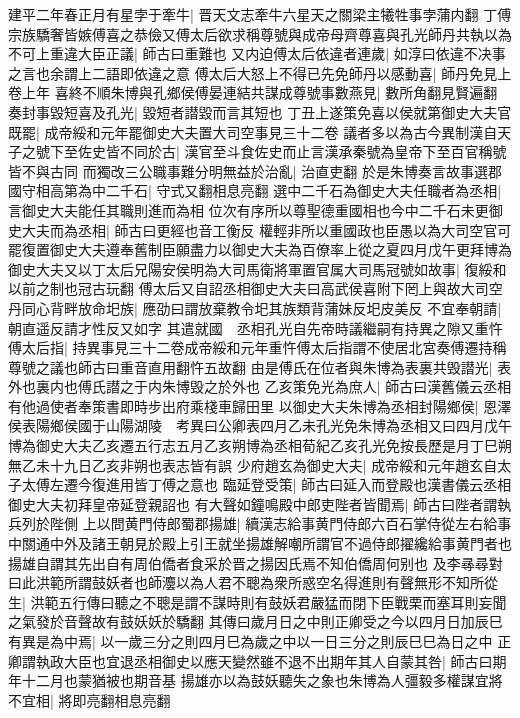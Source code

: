 建平二年春正月有星孛于牽牛|{
	晋天文志牽牛六星天之關梁主犧牲事孛蒲内翻}
丁傅宗族驕奢皆嫉傅喜之恭儉又傅太后欲求稱尊號與成帝母齊尊喜與孔光師丹共執以為不可上重違大臣正議|{
	師古曰重難也}
又内迫傅太后依違者連歲|{
	如淳曰依違不决事之言也余謂上二語即依違之意}
傅太后大怒上不得已先免師丹以感動喜|{
	師丹免見上卷上年}
喜終不順朱博與孔鄉侯傅晏連結共謀成尊號事數燕見|{
	數所角翻見賢遍翻}
奏封事毀短喜及孔光|{
	毀短者譛毀而言其短也}
丁丑上遂策免喜以侯就第御史大夫官既罷|{
	成帝綏和元年罷御史大夫置大司空事見三十二卷}
議者多以為古今異制漢自天子之號下至佐史皆不同於古|{
	漢官至斗食佐史而止言漢承秦號為皇帝下至百官稱號皆不與古同}
而獨改三公職事難分明無益於治亂|{
	治直吏翻}
於是朱博奏言故事選郡國守相高第為中二千石|{
	守式又翻相息亮翻}
選中二千石為御史大夫任職者為丞相|{
	言御史大夫能任其職則進而為相}
位次有序所以尊聖德重國相也今中二千石未更御史大夫而為丞相|{
	師古曰更經也音工衡反}
權輕非所以重國政也臣愚以為大司空官可罷復置御史大夫遵奉舊制臣願盡力以御史大夫為百僚率上從之夏四月戊午更拜博為御史大夫又以丁太后兄陽安侯明為大司馬衛將軍置官属大司馬冠號如故事|{
	復綏和以前之制也冠古玩翻}
傅太后又自詔丞相御史大夫曰高武侯喜附下罔上與故大司空丹同心背畔放命圯族|{
	應劭曰謂放棄教令圯其族類背蒲妹反圯皮美反}
不宜奉朝請|{
	朝直遥反請才性反又如字}
其遣就國　丞相孔光自先帝時議繼嗣有持異之隙又重忤傅太后指|{
	持異事見三十二卷成帝綏和元年重忤傅太后指謂不使居北宮奏傅遷持稱尊號之議也師古曰重音直用翻忤五故翻}
由是傅氏在位者與朱博為表裏共毁譛光|{
	表外也裏内也傅氏譛之于内朱博毁之於外也}
乙亥策免光為庶人|{
	師古曰漢舊儀云丞相有他過使者奉策書即時步出府乘棧車歸田里}
以御史大夫朱博為丞相封陽鄉侯|{
	恩澤侯表陽鄉侯國于山陽湖陵　考異曰公卿表四月乙未孔光免朱博為丞相又曰四月戊午博為御史大夫乙亥遷五行志五月乙亥朔博為丞相荀紀乙亥孔光免按長歷是月丁巳朔無乙未十九日乙亥非朔也表志皆有誤}
少府趙玄為御史大夫|{
	成帝綏和元年趙玄自太子太傅左遷今復進用皆丁傅之意也}
臨延登受策|{
	師古曰延入而登殿也漢書儀云丞相御史大夫初拜皇帝延登親詔也}
有大聲如鐘鳴殿中郎吏陛者皆聞焉|{
	師古曰陛者謂執兵列於陛側}
上以問黄門侍郎蜀郡揚雄|{
	續漢志給事黄門侍郎六百石掌侍從左右給事中關通中外及諸王朝見於殿上引王就坐揚雄解嘲所謂官不過侍郎擢纔給事黄門者也揚雄自謂其先出自有周伯僑者食采於晋之揚因氏焉不知伯僑周何别也}
及李㝷尋對曰此洪範所謂鼓妖者也師灋以為人君不聰為衆所惑空名得進則有聲無形不知所從生|{
	洪範五行傳曰聽之不聰是謂不謀時則有鼓妖君嚴猛而閉下臣戰栗而塞耳則妄聞之氣發於音聲故有鼓妖妖於驕翻}
其傳曰歲月日之中則正卿受之今以四月日加辰巳有異是為中焉|{
	以一歲三分之則四月巳為歲之中以一日三分之則辰巳巳為日之中}
正卿謂執政大臣也宜退丞相御史以應天變然雖不退不出期年其人自蒙其咎|{
	師古曰期年十二月也蒙猶被也期音基}
揚雄亦以為鼓妖聽失之象也朱博為人彊毅多權謀宜將不宜相|{
	將即亮翻相息亮翻}
